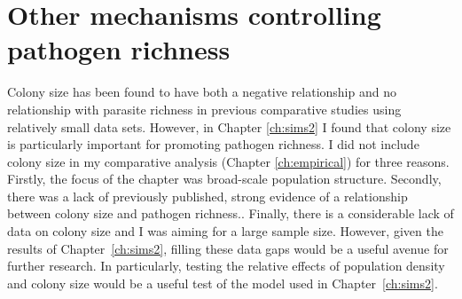 \section{Other mechanisms controlling pathogen richness}

Colony size has been found to have both a negative relationship \cite{gay2014parasite} and no relationship \cite{turmelle2009correlates} with parasite richness in previous comparative studies using relatively small data sets.
However, in Chapter \ref{ch:sims2} I found that colony size is particularly important for promoting pathogen richness.
I did not include colony size in my comparative analysis (Chapter \ref{ch:empirical}) for three reasons.
Firstly, the focus of the chapter was broad-scale population structure.
Secondly, there was a lack of previously published, strong evidence of a relationship between colony size and pathogen richness.\cite{turmelle2009correlates}.
Finally, there is a considerable lack of data on colony size and I was aiming for a large sample size.
However, given the results of Chapter~\ref{ch:sims2}, filling these data gaps would be a useful avenue for further research.
In particularly, testing the relative effects of population density and colony size would be a useful test of the model used in Chapter~\ref{ch:sims2}.

